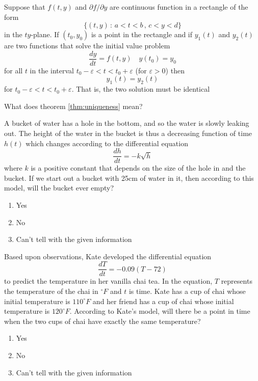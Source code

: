 \begin{thm}\label{thm:uniqueness}
    Suppose that $f(t,y)$ and $\partial f/\partial y$ are continuous function in a
    rectangle of  the form 
    \[ \{ (t,y) \, : \, a < t < b \, , \, c < y < d \} \]
    in the $ty$-plane.  If $(t_0,y_0)$ is a point in the rectangle and if $y_1(t)$ and
    $y_2(t)$ are two functions that solve the initial value problem 
    \[ \frac{dy}{dt} = f(t,y) \quad y(t_0) = y_0  \]
    for all $t$ in the interval $t_0 - \varepsilon < t < t_0 + \varepsilon$ (for
    $\varepsilon >0$) then
    \[ y_1(t) = y_2(t) \]
    for $t_0 - \varepsilon < t < t_0 + \varepsilon$.  That is, the two solution must be
    identical
\end{thm}
\begin{problem}
    What does theorem \ref{thm:uniqueness} mean?
\end{problem}


\begin{problem}
    A bucket of water has a hole in the bottom, and so the water is slowly leaking out.
    The height of the water in the bucket is thus a decreasing function of time $h(t)$
    which changes according to the differential equation 
    \[ \frac{dh}{dt} = -k\sqrt{h} \]
    where $k$ is a positive constant that depends on the size of the hole in and the
    bucket.  If we start out a bucket with 25cm of water in it, then according to this
    model, will the bucket ever empty?
    \begin{enumerate}
        \item Yes
        \item No
        \item Can't tell with the given information
    \end{enumerate}
\end{problem}



\begin{problem}
    Based upon observations, Kate developed the differential equation 
    \[ \frac{dT}{dt}= -0.09(T-72) \]
    to predict the temperature in her vanilla chai tea.  In the equation, $T$ represents
    the temperature of the chai in $^\circ F$ and $t$ is time.  Kate has a cup of chai
    whose initial temperature is $110^\circ F$ and her friend has a cup of chai whose
    initial temperature is $120^\circ F$.  According to Kate's model, will there be a
    point in time when the two cups of chai have exactly the same temperature?
    \begin{enumerate}
        \item Yes
        \item No
        \item Can't tell with the given information
    \end{enumerate}
\end{problem}


